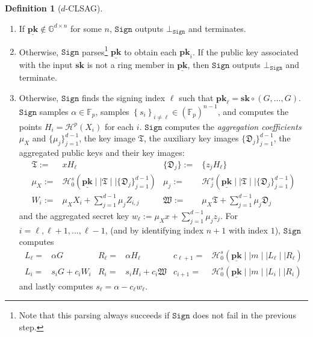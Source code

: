 \documentclass{mrl}
\theoremstyle{plain}
\theoremstyle{definition}
\newtheorem{definition}{Definition}[section]
\begin{document}
\begin{definition}[$d$-CLSAG]
\begin{itemize}
\begin{enumerate}
\item If $\underline{\textbf{pk}} \notin \mathbb{G}^{d\times n}$ for some $n$, $\texttt{Sign}$ outputs $\bot_{\texttt{Sign}}$ and terminates. 

\item Otherwise, $\texttt{Sign}$ parses\footnote{Note that this parsing always succeeds if $\texttt{Sign}$ does not fail in the previous step.} $\underline{\textbf{pk}}$ to obtain each $\textbf{pk}_i$. If the public key associated with the input $\textbf{sk}$ is not a ring member in $\underline{\textbf{pk}}$, then $\texttt{Sign}$ outputs $\bot_{\texttt{Sign}}$ and terminate.

\item Otherwise, $\texttt{Sign}$ finds the signing index $\ell$ such that $\textbf{pk}_\ell = \textbf{sk} \circ (G, \ldots, G)$. $\texttt{Sign}$ samples $\alpha \in \mathbb{F}_p$, samples $\left\{s_i\right\}_{i \neq \ell} \in (\mathbb{F}_p)^{n-1}$, and computes the points $H_i = \mathcal{H}^p(X_i)$ for each $i$. $\texttt{Sign}$ computes the \textit{aggregation coefficients} $\mu_X$ and $\{\mu_j\}_{j=1}^{d-1}$, the key image $\mathfrak{T}$, the auxiliary key images $\{\mathfrak{D}_j\}_{j=1}^{d-1}$, the aggregated public keys and their key images:
\begin{align*}
\mathfrak{T} :=& x H_\ell & \{\mathfrak{D}_j\} :=&  \{z_j H_\ell\} \\
\mu_X :=& \mathcal{H}^s_0(\underline{\textbf{pk}} \mid \mid \mathfrak{T} \mid \mid \{\mathfrak{D}_j\}_{j=1}^{d-1}) 
 & \mu_j :=& \mathcal{H}^s_j(\underline{\textbf{pk}} \mid \mid \mathfrak{T} \mid \mid \{\mathfrak{D}_j\}_{j=1}^{d-1}) \\
 W_i :=& \mu_X X_i + \sum_{j=1}^{d-1} \mu_j Z_{i,j} & \mathfrak{W} :=& \mu_X \mathfrak{T} + \sum_{j=1}^{d-1} \mu_j \mathfrak{D}_j
 \end{align*} and the aggregated secret key $w_\ell :=  \mu_X x + \sum_{j=1}^{d-1} \mu_j z_j$. For $i = \ell, \ell+1, \ldots, \ell-1$, (and by identifying index $n+1$ with index $1$), $\texttt{Sign}$ computes
\begin{align*}
L_\ell =& \alpha G & R_\ell =& \alpha H_\ell & c_{\ell+1} =& \mathcal{H}^s_0(\underline{\textbf{pk}} \mid \mid m \mid \mid L_\ell \mid \mid R_\ell) \\ 
L_i =& s_i G + c_i W_i & R_i =& s_i H_i + c_i \mathfrak{W}  
 & c_{i+1} =& \mathcal{H}^s_0(\underline{\textbf{pk}} \mid \mid m \mid \mid L_i \mid \mid R_i)
\end{align*} and lastly computes $s_\ell = \alpha - c_\ell w_\ell$.


\end{enumerate}
\end{itemize}
\end{definition}
\end{document}
